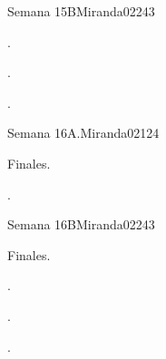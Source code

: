 \begin{syllabus}
\begin{unit}{}{Semana 15B}{Miranda02}{24}{3}
   \begin{learningoutcomes}
      \item . 
      \item .
      \item . 
      \end{learningoutcomes}
\end{unit}

\begin{unit}{}{Semana 16A.}{Miranda02}{12}{4}
   \begin{topics}
      \item Finales.
   \end{topics}
   \begin{learningoutcomes}
      \item . 
   \end{learningoutcomes}
\end{unit}

\begin{unit}{}{Semana 16B}{Miranda02}{24}{3}
   \begin{topics}
      \item Finales.
   \end{topics}

   \begin{learningoutcomes}
      \item . 
      \item .
      \item . 
      \end{learningoutcomes}
\end{unit}



\begin{coursebibliography}
\end{coursebibliography}

\end{syllabus}
